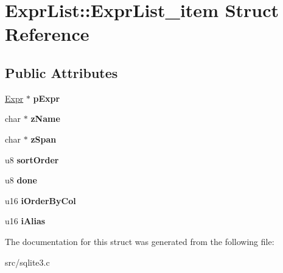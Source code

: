 \hypertarget{struct_expr_list_1_1_expr_list__item}{\section{Expr\-List\-:\-:Expr\-List\-\_\-item Struct Reference}
\label{struct_expr_list_1_1_expr_list__item}
}
\subsection*{Public Attributes}
\begin{DoxyCompactItemize}
\item 
\hypertarget{struct_expr_list_1_1_expr_list__item_a75906cf3ff19e5bf16373fec7f3c79ad}{\hyperlink{struct_expr}{Expr} $\ast$ {\bfseries p\-Expr}}\label{struct_expr_list_1_1_expr_list__item_a75906cf3ff19e5bf16373fec7f3c79ad}

\item 
\hypertarget{struct_expr_list_1_1_expr_list__item_af278eb03a1169c73d144547adaf9b04f}{char $\ast$ {\bfseries z\-Name}}\label{struct_expr_list_1_1_expr_list__item_af278eb03a1169c73d144547adaf9b04f}

\item 
\hypertarget{struct_expr_list_1_1_expr_list__item_ade485bb6fafb44ec2aba59d05b8d117b}{char $\ast$ {\bfseries z\-Span}}\label{struct_expr_list_1_1_expr_list__item_ade485bb6fafb44ec2aba59d05b8d117b}

\item 
\hypertarget{struct_expr_list_1_1_expr_list__item_af9084dc073f96792c0c7a8a894778881}{u8 {\bfseries sort\-Order}}\label{struct_expr_list_1_1_expr_list__item_af9084dc073f96792c0c7a8a894778881}

\item 
\hypertarget{struct_expr_list_1_1_expr_list__item_a84aad270c98e28a725a840aac3ee8576}{u8 {\bfseries done}}\label{struct_expr_list_1_1_expr_list__item_a84aad270c98e28a725a840aac3ee8576}

\item 
\hypertarget{struct_expr_list_1_1_expr_list__item_ae1d4a3f24152d41772694bebef2ef81c}{u16 {\bfseries i\-Order\-By\-Col}}\label{struct_expr_list_1_1_expr_list__item_ae1d4a3f24152d41772694bebef2ef81c}

\item 
\hypertarget{struct_expr_list_1_1_expr_list__item_a06fc9fdfb94d35ec6ca742da23609239}{u16 {\bfseries i\-Alias}}\label{struct_expr_list_1_1_expr_list__item_a06fc9fdfb94d35ec6ca742da23609239}

\end{DoxyCompactItemize}


The documentation for this struct was generated from the following file\-:\begin{DoxyCompactItemize}
\item 
src/sqlite3.\-c\end{DoxyCompactItemize}
